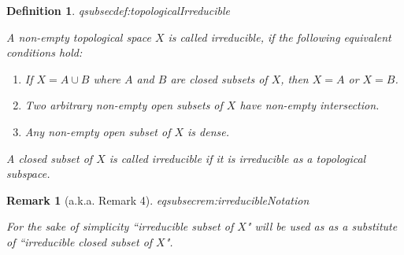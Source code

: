 \documentclass[DIV=14,parskip=full,pointednumbers]{scrartcl}
\newenvironment{alphanumerate}{\begin{enumerate}[label={$(\alph*)$},ref=\curthm]}{\end{enumerate}}
\theoremstyle{cthm}
\theoremstyle{cvarthm}
\theoremstyle{cdef}
\newtheorem{defi}{Definition}[subsection]
\newtheorem{rem}{Remark}[subsection]
\newcommand{\lbl}[1]{
	\label{#1}
	\ifmmode
	\expandafter\xdef\csname eqsubsec#1\endcsname{\thesubsection}
	\fi
}
\begin{document}
	\begin{defi}\lbl{def:topologicalIrreducible}
		A non-empty topological space $X$ is called \emph{irreducible},  if the following equivalent conditions hold:
		\begin{alphanumerate}
			\item If $X=A\cup B$ where $A$ and $B$ are closed subsets of $X$, then $X=A$ or $X=B$. 
			\item Two arbitrary non-empty open subsets of $X$ have non-empty intersection.
			\item Any non-empty open subset of $X$ is dense.
		\end{alphanumerate}
		A closed subset of $X$ is called irreducible if it is irreducible as a topological subspace.
	\end{defi}
	\begin{rem}[a.k.a. Remark 4]\lbl{rem:irreducibleNotation}
		For the sake of simplicity ``irreducible subset of $X$" will be used as as a substitute of ``irreducible closed subset of $X$".
	\end{rem}
	
\end{document}

